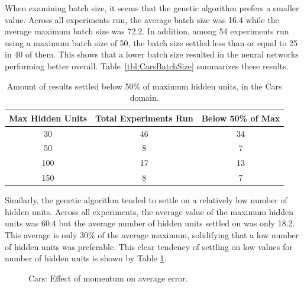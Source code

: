 \documentclass[10pt, conference, compsocconf]{IEEEtran}
\begin{document}
When examining batch size, it seems that the genetic algorithm prefers a smaller value. Across all experiments run, the average batch size was 16.4 while the average maximum batch size was 72.2. In addition, among 54 experiments run using a maximum batch size of 50, the batch size settled less than or equal to 25 in 40 of them. This shows that a lower batch size resulted in the neural networks performing better overall. Table~\ref{tbl:CarsBatchSize} summarizes these results. 

\begin{table}
\caption{Amount of results settled below 50\% of maximum hidden units, in the Cars domain.}
\label{tbl:CarsNumHidden}
\centering
\begin{tabular}{c c c}
\hline
Max Hidden Units & Total Experiments Run & Below 50\% of Max \\
\hline
30 & 46 & 34 \\
50 & 8 & 7 \\
100 & 17 & 13 \\
150 & 8 & 7 \\
\hline
\end{tabular}
\end{table}

Similarly, the genetic algorithm tended to settle on a relatively low number of hidden units. Across all experiments, the average value of the maximum hidden units was 60.4 but the average number of hidden units settled on was only 18.2. This average is only 30\% of the average maximum, solidifying that a low number of hidden units was preferable. This clear tendency of settling on low values for number of hidden units is shown by Table \ref{tbl:CarsNumHidden}.

\begin{figure}
\begin{center}
\end{center}
\caption{Cars: Effect of momentum on average error.}
\label{fig:CarsMomentum}
\end{figure}
\end{document}
